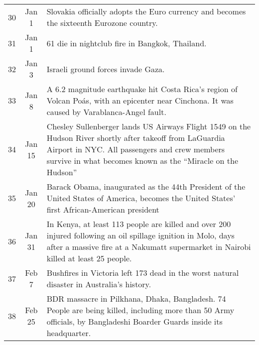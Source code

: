 \documentclass[a4paper]{article}
\begin{document}
\begin{center}
\begin{tabularx}{\linewidth}{@{}c @{}c X@{}}
30 & Jan 1 & Slovakia officially adopts the Euro currency and becomes the sixteenth Eurozone country. \\
31 & Jan 1 & 61 die in nightclub fire in Bangkok, Thailand. \\
32 & Jan 3 & Israeli ground forces invade Gaza. \\
33 & Jan 8 & A 6.2 magnitude earthquake hit Costa Rica's region of Volcan Poás, with an epicenter near Cinchona. It was caused by Varablanca-Angel fault. \\
34 & Jan 15 & Chesley Sullenberger lands US Airways Flight 1549 on the Hudson River shortly after takeoff from LaGuardia Airport in NYC. All passengers and crew members survive in what becomes known as the ``Miracle on the Hudson'' \\
35 & Jan 20 & Barack Obama, inaugurated as the 44th President of the United States of America, becomes the United States' first African-American president \\
36 & Jan 31 & In Kenya, at least 113 people are killed and over 200 injured following an oil spillage ignition in Molo, days after a massive fire at a Nakumatt supermarket in Nairobi killed at least 25 people. \\
37 & Feb 7 & Bushfires in Victoria left 173 dead in the worst natural disaster in Australia's history. \\
38 & Feb 25 & BDR massacre in Pilkhana, Dhaka, Bangladesh. 74 People are being killed, including more than 50 Army officials, by Bangladeshi Boarder Guards inside its headquarter. \\

\bottomrule[1.25pt]
\end{tabularx}
\end{center}



\end{document}
